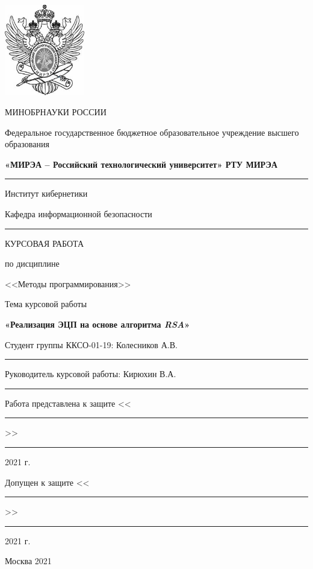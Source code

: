 \begin{center}
\thispagestyle{empty} 

\begin{spacing}{1}

\includegraphics[width=35mm]{img/logo.jpg} 

{

{МИНОБРНАУКИ РОССИИ}

{Федеральное государственное бюджетное образовательное \linebreak учреждение высшего образования}

{
{\bf «МИРЭА – Российский технологический университет» \linebreak РТУ МИРЭА}
}
\rule{1\columnwidth}{1pt}
{Институт кибернетики \smallskip}

{Кафедра информационной безопасности}
\rule{1\columnwidth}{1pt}

}

\end{spacing}

\vspace{1.5cm}

{
КУРСОВАЯ РАБОТА

по дисциплине

<<Методы программирования>>
}

\vspace{0.5cm}

{
Тема курсовой работы

\large\bf
«Реализация ЭЦП на основе алгоритма \emph{RSA}»
}

\vspace{1.5cm}

\begin{flushleft}
Студент группы ККСО-01-19: Колесников А.В. \rule{4cm}{0.5pt}

\vspace{1cm}

Руководитель курсовой работы: Кирюхин В.А. \rule{4cm}{0.5pt}

\vspace{1cm}

Работа представлена к защите <<\rule{1cm}{0.5pt}>> \rule{2cm}{0.5pt} 2021 г.

\vspace{1cm}

Допущен к защите <<\rule{1cm}{0.5pt}>> \rule{2cm}{0.5pt} 2021 г.
\end{flushleft}


\vspace{1.5cm}

{Москва 2021}

\end{center}

